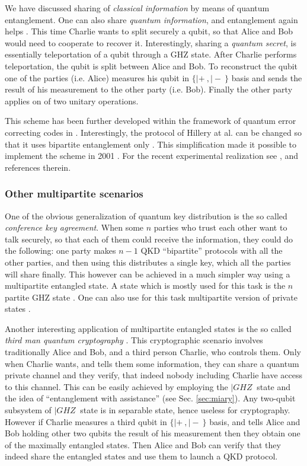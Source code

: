 \documentclass[twocolumn,aps,rmp]{revtex4}
\begin{document}
We have discussed sharing of {\it classical information} by means of
quantum entanglement. One can also share {\it quantum information},
and entanglement again helps \cite{Hillery_secret_sharing}. This
time Charlie wants to split securely a qubit, so that Alice and Bob
would need to cooperate to recover it. Interestingly, sharing a {\it
quantum secret}, is essentially teleportation of a qubit through a
GHZ state. After Charlie performs teleportation, the qubit
is split between Alice and Bob. To reconstruct the qubit one of the
parties (i.e. Alice) measures his qubit in $\{|+\>,|-\>\}$ basis and
sends the result of his measurement to the other party (i.e. Bob).
Finally the other party applies on of two unitary operations.

This scheme has been further developed within the framework of
quantum error correcting codes in
\cite{Cleve_secret_sharing,Gottesman_secret_sharing}. Interestingly,
the protocol of Hillery at al. can be changed so that it uses
bipartite entanglement only \cite{EPR_secret_sharing}. This
simplification made it possible to implement the scheme in 2001
\cite{Tittelexp_secret_sharing}. For the recent experimental
realization see \cite{Panexp_secret_sharing}, and references
therein.

\subsubsection{Other multipartite scenarios}
\label{subsec:othermulti}
One of the obvious generalization of quantum key distribution is the
so called {\it conference key agreement}. When some $n$ parties who
trust each other want to talk securely, so that each of them could
receive the information, they could do the following: one party
makes $n-1$ QKD ``bipartite'' protocols with all the other parties,
and then using this distributes a single key, which all the parties
will share finally. This however can be achieved in a much simpler
way using a multipartite entangled state. A state which is mostly
used for this task is the $n$ partite GHZ state
\cite{ChenLo_multi_dist}. One can also use for this task multipartite version
of private states \cite{AH-pditdist}.

Another interesting application of multipartite entangled states is
the so called {\it third man quantum cryptography}
\cite{Zuk_third_man_crypto}. This cryptographic scenario involves
traditionally Alice and Bob, and a third person Charlie, who
controls them. Only when Charlie wants, and tells them some
information, they can share a quantum private channel and they
verify, that indeed nobody including Charlie have access to this
channel. This can be easily achieved by employing the $|GHZ\>$ state
and the idea of ``entanglement with assistance'' (see Sec.
\ref{sec:miary}). Any two-qubit subsystem of $|GHZ\>$ state is in
separable state, hence useless for cryptography. However if
Charlie measures a third qubit in $\{|+\>,|-\>\}$ basis, and tells Alice
and Bob holding other two qubits the result of his measurement then
they obtain one of the maximally entangled states. Then Alice and
Bob can verify that they indeed share the entangled states and use
them to launch a QKD protocol.
\end{document}
